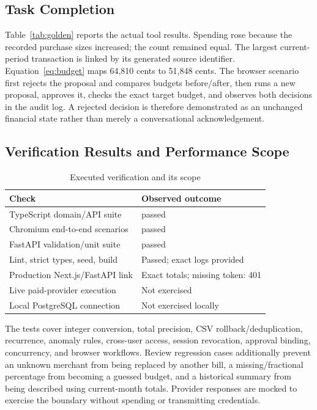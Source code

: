 \documentclass[conference,a4paper]{IEEEtran}
\begin{document}
\subsection{Task Completion}
Table~\ref{tab:golden} reports the actual tool results. Spending rose because the recorded purchase sizes increased; the count remained equal. The largest current-period transaction is linked by its generated source identifier. Equation~\eqref{eq:budget} maps 64,810 cents to 51,848 cents. The browser scenario first rejects the proposal and compares budgets before/after, then runs a new proposal, approves it, checks the exact target budget, and observes both decisions in the audit log. A rejected decision is therefore demonstrated as an unchanged financial state rather than merely a conversational acknowledgement.

\subsection{Verification Results and Performance Scope}
\begin{table}[t]
\caption{Executed verification and its scope}
\centering\small
\begin{tabular}{L{43mm}L{36mm}}
\toprule Check & Observed outcome\\\midrule
TypeScript domain/API suite & \UnitTests{} passed\\
Chromium end-to-end scenarios & \BrowserTests{} passed\\
FastAPI validation/unit suite & \PythonTests{} passed\\
Lint, strict types, seed, build & Passed; exact logs provided\\
Production Next.js/FastAPI link & Exact totals; missing token: 401\\
Live paid-provider execution & Not exercised\\
Local PostgreSQL connection & Not exercised locally\\
\bottomrule
\end{tabular}
\label{tab:verification}
\end{table}

The tests cover integer conversion, total precision, CSV rollback/deduplication, recurrence, anomaly rules, cross-user access, session revocation, approval binding, concurrency, and browser workflows. Review regression cases additionally prevent an unknown merchant from being replaced by another bill, a missing/fractional percentage from becoming a guessed budget, and a historical summary from being described using current-month totals. Provider responses are mocked to exercise the boundary without spending or transmitting credentials.
\end{document}
